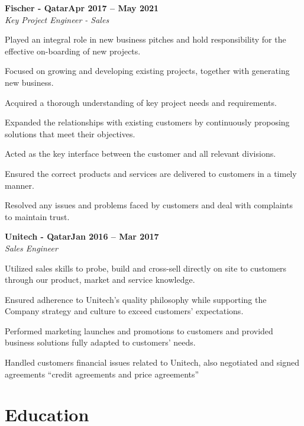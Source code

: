 \documentclass[letterpaper,12pt]{article}
\newcommand{\heading}[2]{
  \hspace{10pt}#1\hfill#2\\
}
\newcommand{\headingBf}[2]{
  \heading{\textbf{#1}}{\textbf{#2}}
}
\newcommand{\headingIt}[2]{
  \heading{\textit{#1}}{\textit{#2}}
}
\newenvironment{resume_list}{
  \vspace{-7pt}
  \begin{itemize}[itemsep=-2px, parsep=1pt, leftmargin=30pt]
}{
  \end{itemize}
}
\begin{document}
  \headingBf{Fischer - Qatar}{Apr 2017 -- May 2021}
  \headingIt{Key Project Engineer - Sales}{}
  \begin{resume_list}
    \item Played an integral role in new business pitches and hold responsibility for the effective on-boarding of new projects.
    \item Focused on growing and developing existing projects, together with generating new business.
    \item Acquired a thorough understanding of key project needs and requirements.
    \item Expanded the relationships with existing customers by continuously proposing solutions that meet their objectives.
    \item Acted as the key interface between the customer and all relevant divisions.
    \item Ensured the correct products and services are delivered to customers in a timely manner.
    \item Resolved any issues and problems faced by customers and deal with complaints to maintain trust.
  \end{resume_list}

 \headingBf{Unitech - Qatar}{Jan 2016 -- Mar 2017}
  \headingIt{Sales Engineer}{}
  \begin{resume_list}
    \item Utilized sales skills to probe, build and cross-sell directly on site to customers through our product, market and service knowledge.
    \item Ensured adherence to Unitech's quality philosophy while supporting the Company strategy and culture to exceed customers' expectations.
    \item Performed marketing launches and promotions to customers and provided business solutions fully adapted to customers’ needs.
    \item Handled customers financial issues related to Unitech, also negotiated and signed agreements “credit agreements and price agreements”
  \end{resume_list}
  

  \section{Education}
\end{document}
